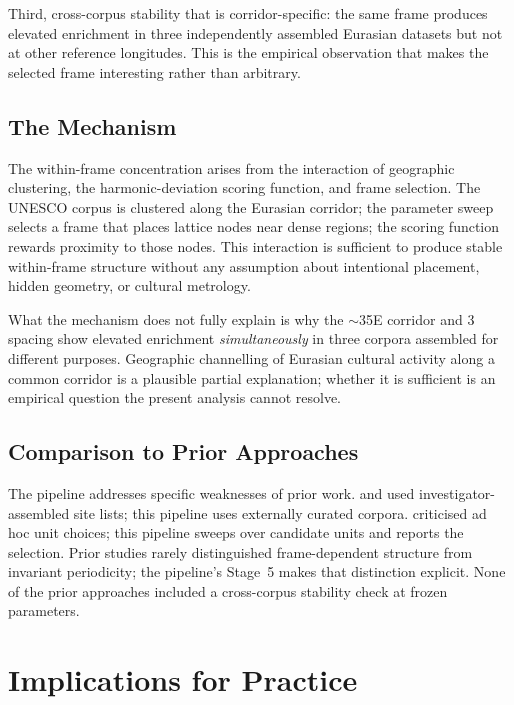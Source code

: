 \documentclass[12pt,a4paper]{article}
\newcommand{\degr}{\ifmmode{^\circ}\else\textdegree{}\fi}
\begin{document}
Third, cross-corpus stability that is corridor-specific: the same frame
produces elevated enrichment in three independently assembled Eurasian
datasets but not at other reference longitudes. This is the empirical
observation that makes the selected frame interesting rather than
arbitrary.

\subsection{The Mechanism}

The within-frame concentration arises from the interaction of
geographic clustering, the harmonic-deviation scoring function, and
frame selection. The UNESCO corpus is clustered along the Eurasian
corridor; the parameter sweep selects a frame that places lattice nodes
near dense regions; the scoring function rewards proximity to those
nodes. This interaction is sufficient to produce stable within-frame
structure without any assumption about intentional placement, hidden
geometry, or cultural metrology.

What the mechanism does not fully explain is why the
$\sim$35\degr{}E corridor and 3\degr{} spacing show elevated enrichment
\emph{simultaneously} in three corpora assembled for different purposes.
Geographic channelling of Eurasian cultural activity along a common
corridor is a plausible partial explanation; whether it is sufficient is
an empirical question the present analysis cannot resolve.

\subsection{Comparison to Prior Approaches}

The pipeline addresses specific weaknesses of prior work.
\citet{thom1967} and \citet{kendall1974} used investigator-assembled
site lists; this pipeline uses externally curated corpora.
\citet{freeman1976} criticised ad hoc unit choices; this pipeline sweeps
over candidate units and reports the selection. Prior studies rarely
distinguished frame-dependent structure from invariant periodicity; the
pipeline's Stage~5 makes that distinction explicit. None of the prior
approaches included a cross-corpus stability check at frozen parameters.

\section{Implications for Practice}
\label{sec:practice}
\end{document}
